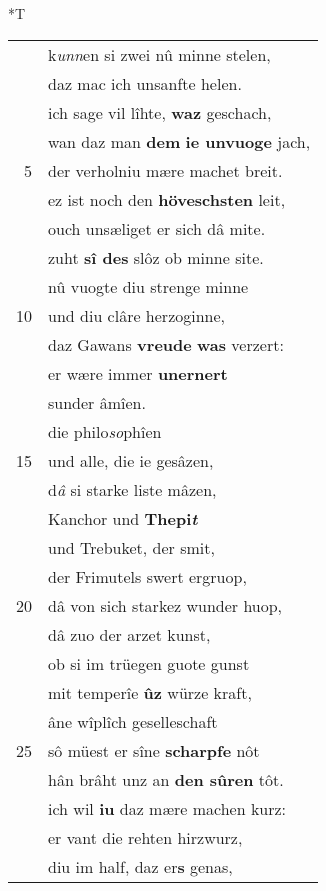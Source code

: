 \documentclass[8pt,a4paper,notitlepage]{article}
\begin{document}
\begin{table}[ht]
\begin{minipage}[t]{0.5\linewidth}
\end{minipage}
\hspace{0.5cm}
\begin{minipage}[t]{0.5\linewidth}
\small
\begin{center}*T
\end{center}
\begin{tabular}{rl}
 & k\textit{unn}en si zwei nû minne stelen,\\ 
 & daz mac ich unsanfte helen.\\ 
 & ich sage vil lîhte, \textbf{waz} geschach,\\ 
 & wan daz man \textbf{dem} \textbf{ie unvuoge} jach,\\ 
5 & der verholniu mære machet breit.\\ 
 & ez ist noch den \textbf{höveschsten} leit,\\ 
 & ouch unsæliget er sich dâ mite.\\ 
 & zuht \textbf{sî des} slôz ob minne site.\\ 
 & nû vuogte diu strenge minne\\ 
10 & und diu clâre herzoginne,\\ 
 & daz Gawans \textbf{vreude} \textbf{was} verzert:\\ 
 & er wære immer \textbf{unernert}\\ 
 & sunder âmîen.\\ 
 & die philo\textit{so}phîen\\ 
15 & und alle, die ie gesâzen,\\ 
 & d\textit{â} si starke liste mâzen,\\ 
 & Kanchor und \textbf{Thepi\textit{t}}\\ 
 & und Trebuket, der smit,\\ 
 & der Frimutels swert ergruop,\\ 
20 & dâ von sich starkez wunder huop,\\ 
 & dâ zuo der arzet kunst,\\ 
 & ob si im trüegen guote gunst\\ 
 & mit temperîe \textbf{ûz} würze kraft,\\ 
 & âne wîplîch geselleschaft\\ 
25 & sô müest er sîne \textbf{scharpfe} nôt\\ 
 & hân brâht unz an \textbf{den sûren} tôt.\\ 
 & ich wil \textbf{iu} daz mære machen kurz:\\ 
 & er vant die rehten hirzwurz,\\ 
 & diu im half, daz er\textbf{s} genas,\\ 

\end{tabular}
\end{minipage}
\end{table}
\end{document}
